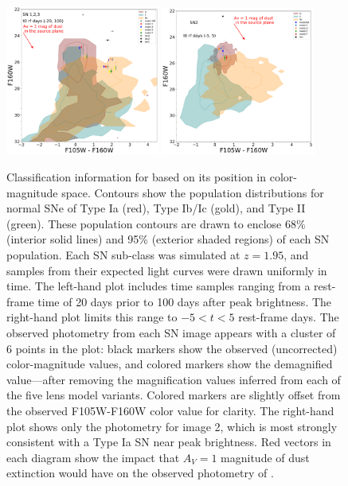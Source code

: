 \documentclass[twocolumn]{aastex63}
\begin{document}
\begin{figure}
    \centering
    \includegraphics[width=0.45\textwidth]{Images/color_mag_contours_all.pdf}
    \includegraphics[width=0.45\textwidth]{Images/color_mag_contours_image2.pdf}
    \caption{Classification information for \SNABC based on its position in color-magnitude space. Contours show the population distributions for normal SNe of Type Ia (red), Type Ib/Ic (gold), and Type II (green).  These population contours are drawn to enclose 68\% (interior solid lines) and 95\% (exterior shaded regions) of each SN population.  Each SN sub-class was simulated at $z=1.95$, and samples from their expected light curves were drawn uniformly in time. 
    The left-hand plot includes time samples ranging from a rest-frame time of 20 days prior to 100 days after peak brightness. The right-hand plot limits this range to $-5<t<5$ rest-frame days.    The observed photometry from each SN image appears with a cluster of 6 points in the plot: black markers show the observed (uncorrected) color-magnitude values, and colored markers show the demagnified value---after removing the magnification values inferred from each of the five lens model variants. Colored markers are slightly offset from the observed F105W-F160W color value for clarity.   The right-hand plot shows only the photometry for image 2, which is most strongly consistent with a Type Ia SN near peak brightness.   Red vectors in each diagram show the impact that $A_V=1$ magnitude of dust extinction would have on the observed photometry of \SNABC.  
    }
    \label{fig:colormag}
\end{figure}
\end{document}

